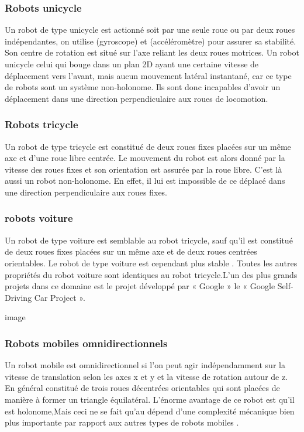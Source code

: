 \subsubsection{Robots unicycle}
Un robot de type unicycle est actionné soit par une seule roue ou par deux roues indépendantes, on utilise (gyroscope) et  (accéléromètre) pour assurer sa stabilité. Son centre de rotation est situé sur l’axe reliant les deux roues motrices. 
Un robot unicycle celui qui bouge dans un plan 2D ayant une certaine vitesse de déplacement vers l’avant, mais aucun mouvement latéral instantané, car ce type de robots sont un système non-holonome. Ils sont donc incapables d’avoir un déplacement dans une direction perpendiculaire aux roues de locomotion.
\subsubsection{Robots tricycle}
Un robot de type tricycle est constitué de deux roues fixes placées sur un même axe et d’une roue libre  centrée. Le mouvement du robot est alors donné par la vitesse des roues fixes et son orientation est assurée par la roue libre. 
C’est là aussi un robot non-holonome. En effet, il lui est impossible de ce déplacé dans une direction perpendiculaire aux roues fixes.
\subsubsection{robots voiture}
Un robot de type voiture est semblable au robot tricycle, sauf qu’il est constitué de deux roues fixes placées sur un même axe et de deux roues centrées orientables.    Le robot de type voiture est cependant plus stable . Toutes les autres propriétés du robot voiture sont identiques au robot tricycle.L’un des plus grands projets dans ce domaine est le projet développé par « Google » le « Google Self-Driving Car Project ».

image 
\subsubsection{Robots mobiles omnidirectionnels}
Un robot mobile est  omnidirectionnel si l’on peut agir indépendamment sur la vitesse de translation selon les axes x et y et la vitesse de rotation autour de z. En général constitué de trois roues décentrées orientables qui sont placées de manière à former un triangle équilatéral.
L’énorme avantage de ce robot  est qu’il est holonome,Mais ceci ne se fait qu’au dépend d’une complexité mécanique bien plus importante par rapport aux autres types de robots mobiles .
